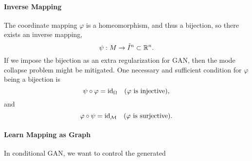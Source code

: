 \paragraph{Inverse Mapping}
The coordinate mapping $\varphi$ is a homeomorphism,
and thus a bijection,
so there exists an inverse mapping,
\begin{equation}
    \psi:M\to \mathring{I}^n\subset{\mathbb{R}}^n.
\end{equation}
If we impose the bijection as an extra regularization for GAN,
then the mode collapse problem might be mitigated.
One necessary and sufficient condition for $\varphi$ being a bijection is
\begin{equation}
    \psi\circ\varphi = {\mathop{\mathrm{id}}}_\Omega \quad
    (\varphi\text{ is injective}),
\end{equation}
and
\begin{equation}
    \varphi\circ\psi = {\mathop{\mathrm{id}}}_{\mathcal{M}} \quad
    (\varphi\text{ is surjective}).
\end{equation}

\paragraph{Learn Mapping as Graph}
In conditional GAN,
we want to control the generated

